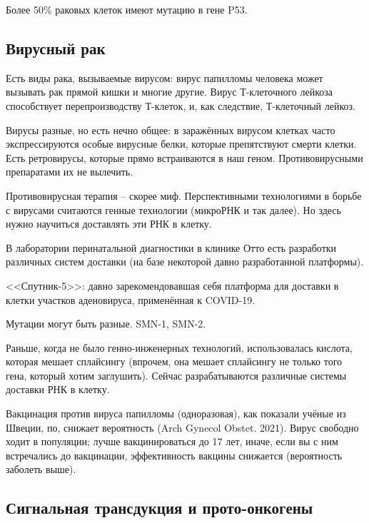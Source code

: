 \documentclass[main.tex]{subfiles}
\begin{document}
Более 50\% раковых клеток имеют мутацию в гене P53.

\subsection{Вирусный рак}

Есть виды рака, вызываемые вирусом: вирус папилломы человека может вызывать рак прямой кишки и многие другие.
Вирус Т-клеточного лейкоза способствует перепроизводству Т-клеток, и, как следствие, Т-клеточный лейкоз.

Вирусы разные, но есть нечно общее: в заражённых вирусом клетках часто экспрессируются особые вирусные белки, которые препятствуют смерти клетки.
Есть ретровирусы, которые прямо встраиваются в наш геном.
Противовирусными препаратами их не вылечить.

\begin{leftbar}
	Противовирусная терапия -- скорее миф.
	Перспективными технологиями в борьбе с вирусами считаются генные технологии (микроРНК и так далее).
	Но здесь нужно научиться доставлять эти РНК в клетку.
	
	В лаборатории перинатальной диагностики в клинике Отто есть разработки различных систем доставки (на базе некоторой давно разработанной платформы).
	
	<<Спутник-5>>: давно зарекомендовавшая себя платформа для доставки в клетки участков аденовируса, применённая к COVID-19.
	
\end{leftbar}

Мутации могут быть разные.
SMN-1, SMN-2.

Раньше, когда не было генно-инженерных технологий, использовалась кислота, которая мешает сплайсингу (впрочем, она мешает сплайсингу не только того гена, который хотим заглушить).
Сейчас разрабатываются различные системы доставки РНК в клетку.

Вакцинация против вируса папилломы (одноразовая), как показали учёные из Швеции, по, снижает вероятность (Arch Gynecol Obstet. 2021).
Вирус свободно ходит в популяции; лучше вакцинироваться до 17 лет, иначе, если вы с ним встречались до вакцинации, эффективность вакцины снижается (вероятность заболеть выше).

\subsection{Сигнальная трансдукция и прото-онкогены}

\end{document}
